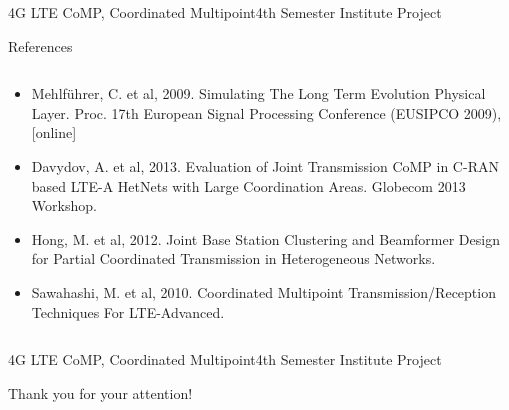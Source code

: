 \documentclass[xcolor={cmyk}]{beamer}
\begin{document}
 \begin{frame}{4G LTE CoMP, Coordinated Multipoint}{4th Semester Institute Project}
	 \begin{block}{References}
	 	\begin{columns}
			\begin{column}{.9\textwidth}
				\begin{itemize}
					\item Mehlführer, C. et al, 2009. Simulating The Long Term Evolution Physical Layer. Proc. 17th European Signal Processing Conference (EUSIPCO 2009), [online]
					\item Davydov, A. et al, 2013. Evaluation of Joint Transmission CoMP in C-RAN based LTE-A HetNets with Large Coordination Areas. Globecom 2013 Workshop.
					\item Hong, M. et al, 2012. Joint Base Station Clustering and Beamformer Design for Partial Coordinated Transmission in Heterogeneous Networks.
					\item Sawahashi, M. et al, 2010. Coordinated Multipoint Transmission/Reception Techniques For LTE-Advanced.
				\end{itemize}
			\end{column}
		\end{columns}
	 \end{block}
 \end{frame}
 
  \begin{frame}{4G LTE CoMP, Coordinated Multipoint}{4th Semester Institute Project}
	\begin{block}{Thank you for your attention!}
	\end{block}
 \end{frame}
\end{document}

